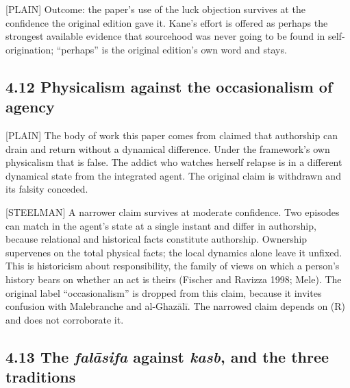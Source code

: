 \documentclass[11pt]{article}
\newcommand{\register}[1]{{\ttfamily\small #1}}
\begin{document}
\register{[PLAIN]} Outcome: the paper's use of the luck objection survives at the confidence the original edition gave it. Kane's effort is offered as perhaps the strongest available evidence that sourcehood was never going to be found in self-origination; ``perhaps'' is the original edition's own word and stays.

\subsection*{4.12 Physicalism against the occasionalism of agency}

\register{[PLAIN]} The body of work this paper comes from claimed that authorship can drain and return without a dynamical difference. Under the framework's own physicalism that is false. The addict who watches herself relapse is in a different dynamical state from the integrated agent. The original claim is withdrawn and its falsity conceded.

\register{[STEELMAN]} A narrower claim survives at moderate confidence. Two episodes can match in the agent's state at a single instant and differ in authorship, because relational and historical facts constitute authorship. Ownership supervenes on the total physical facts; the local dynamics alone leave it unfixed. This is historicism about responsibility, the family of views on which a person's history bears on whether an act is theirs (Fischer and Ravizza 1998; Mele). The original label ``occasionalism'' is dropped from this claim, because it invites confusion with Malebranche and al-Ghazālī. The narrowed claim depends on (R) and does not corroborate it.

\subsection*{4.13 The \emph{falāsifa} against \emph{kasb}, and the three traditions}
\end{document}
